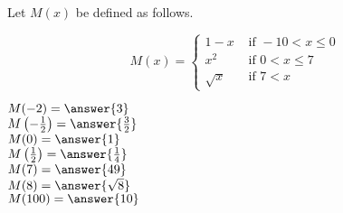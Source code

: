 \documentclass{ximera}
\author{Lee Wayand}
\begin{document}
\begin{exercise}




Let $M(x)$ be defined as follows.

\[
M(x) = 
\begin{cases}
  1 - x & \text{ if } -10 < x \leq 0 \\
  x^2 & \text{ if } 0 < x \leq 7 \\
  \sqrt{x} & \text{ if } 7 < x 
\end{cases}
\]


$M(-2) = \answer{3}$ \\


$M\left( -\frac{1}{2} \right) = \answer{\frac{3}{2}}$ \\


$M(0) = \answer{1}$ \\


$M\left( \frac{1}{2} \right) = \answer{\frac{1}{4}}$ \\


$M(7) = \answer{49}$ \\


$M(8) = \answer{\sqrt{8}}$ \\


$M(100) = \answer{10}$ \\


\end{exercise}
\end{document}
